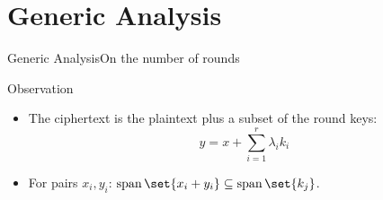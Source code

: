\section{Generic Analysis}
\begin{frame}{Generic Analysis}{On the number of rounds}
    \vspace{-20pt}
    \begin{minipage}[t][85pt][t]{0.47\textwidth}
        \begin{block}{Observation\vpPp}
            \begin{itemize}
                \item The ciphertext is the plaintext plus a subset of the round keys:
                    \begin{equation*}
                        y = x + \sum_{i=1}^{r} \lambda_i k_i
                    \end{equation*}
                \item For pairs $x_i, y_i$: $\Span \set{x_i + y_i} \subseteq \Span \set{k_j}$.
            \end{itemize}
            \vspace{2pt}
        \end{block}
    \end{minipage}
    \hfill
    \begin{minipage}[t][85pt][t]{0.47\textwidth}
    \end{minipage}

    \vspace{50pt}


\end{frame}
